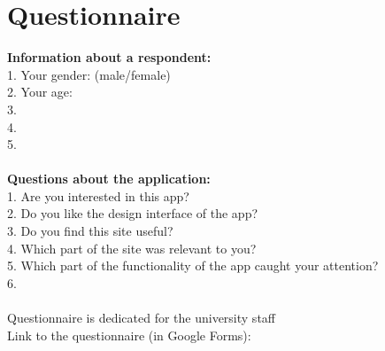 \chapter{Questionnaire}\label{app:A}
\textbf{Information about a respondent:}
\\1. Your gender: (male/female)
\\2. Your age:
\\3.  
\\4.
\\5.
\\
\\\textbf{Questions about the application:}
\\1. Are you interested in this app?
\\2. Do you like the design interface of the app?
\\3. Do you find this site useful?
\\4. Which part of the site was relevant to you?
\\5. Which part of the functionality of the app caught your attention?
\\6.
\\
\\Questionnaire is dedicated for the university staff
\\Link to the questionnaire (in Google Forms):


